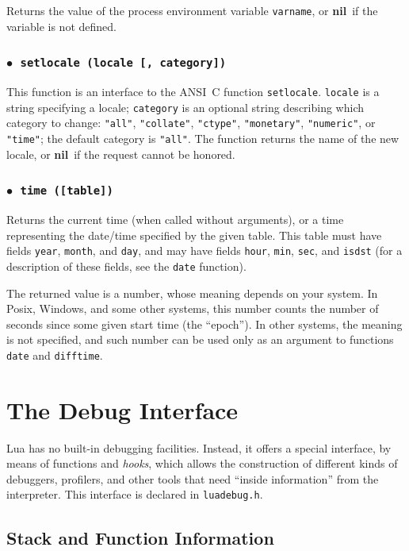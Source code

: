 \documentclass[11pt]{article}
\makeatletter
\newcommand{\T}[1]{{\tt #1}}
\newcommand{\nil}{{\bf nil}}
\newcommand{\DefLIB}[1]{\index{#1@{\tt #1}}}
\newcommand{\ff}{$\bullet$\ }
\makeatother
\begin{document}
Returns the value of the process environment variable \verb|varname|,
or \nil\ if the variable is not defined.

\subsubsection*{\ff \T{setlocale (locale [, category])}}\DefLIB{setlocale}

This function is an interface to the ANSI~C function \verb|setlocale|.
\verb|locale| is a string specifying a locale;
\verb|category| is an optional string describing which category to change:
\verb|"all"|, \verb|"collate"|, \verb|"ctype"|,
\verb|"monetary"|, \verb|"numeric"|, or \verb|"time"|;
the default category is \verb|"all"|.
The function returns the name of the new locale,
or \nil\ if the request cannot be honored.

\subsubsection*{\ff \T{time ([table])}}\DefLIB{time}

Returns the current time (when called without arguments),
or a time representing the date/time specified by the given table.
This table must have fields \verb|year|, \verb|month|, and \verb|day|,
and may have fields \verb|hour|, \verb|min|, \verb|sec|, and \verb|isdst|
(for a description of these fields, see the \verb|date| function).

The returned value is a number, whose meaning depends on your system.
In Posix, Windows, and some other systems, this number counts the number
of seconds since some given start time (the ``epoch'').
In other systems, the meaning is not specified,
and such number can be used only as an argument to
functions \verb|date| and \verb|difftime|.


\section{The Debug Interface} \label{debugI}

Lua has no built-in debugging facilities.
Instead, it offers a special interface,
by means of functions and \emph{hooks},
which allows the construction of different
kinds of debuggers, profilers, and other tools
that need ``inside information'' from the interpreter.
This interface is declared in \verb|luadebug.h|.

\subsection{Stack and Function Information}
\end{document}
